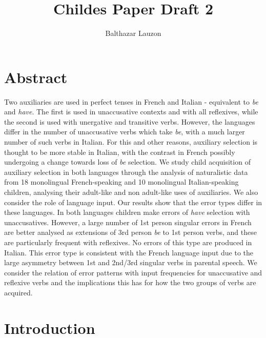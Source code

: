 \documentclass[
  12pt,
]{article}
\title{Childes Paper Draft 2}
\author{Balthazar Lauzon}
\date{}
\begin{document}
\maketitle

\hypertarget{abstract}{%
\section{Abstract}\label{abstract}}

Two auxiliaries are used in perfect tenses in French and Italian - equivalent to \emph{be} and \emph{have}. The first is used in unaccusative contexts and with all reflexives, while the second is used with unergative and transitive verbs. However, the languages differ in the number of unaccusative verbs which take \emph{be}, with a much larger number of such verbs in Italian. For this and other reasons, auxiliary selection is thought to be more stable in Italian, with the contrast in French possibly undergoing a change towards loss of \emph{be} selection. We study child acquisition of auxiliary selection in both languages through the analysis of naturalistic data from 18 monolingual French-speaking and 10 monolingual Italian-speaking children, analysing their adult-like and non adult-like uses of auxiliaries. We also consider the role of language input. Our results show that the error types differ in these languages. In both languages children make errors of \emph{have} selection with unaccusatives. However, a large number of 1st person singular errors in French are better analysed as extensions of 3rd person \emph{be} to 1st person verbs, and these are particularly frequent with reflexives. No errors of this type are produced in Italian. This error type is consistent with the French language input due to the large asymmetry between 1st and 2nd/3rd singular verbs in parental speech. We consider the relation of error patterns with input frequencies for unaccusative and reflexive verbs and the implications this has for how the two groups of verbs are acquired.

\newpage

\hypertarget{introduction}{%
\section{Introduction}\label{introduction}}
\end{document}
